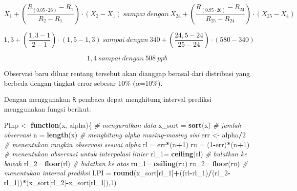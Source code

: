 \documentclass[]{book}
\newenvironment{Shaded}{\begin{snugshade}}{\end{snugshade}}
\newcommand{\KeywordTok}[1]{\textcolor[rgb]{0.13,0.29,0.53}{\textbf{#1}}}
\newcommand{\DecValTok}[1]{\textcolor[rgb]{0.00,0.00,0.81}{#1}}
\newcommand{\StringTok}[1]{\textcolor[rgb]{0.31,0.60,0.02}{#1}}
\newcommand{\CommentTok}[1]{\textcolor[rgb]{0.56,0.35,0.01}{\textit{#1}}}
\newcommand{\ControlFlowTok}[1]{\textcolor[rgb]{0.13,0.29,0.53}{\textbf{#1}}}
\newcommand{\OperatorTok}[1]{\textcolor[rgb]{0.81,0.36,0.00}{\textbf{#1}}}
\newcommand{\NormalTok}[1]{#1}
\begin{document}
\[
  X_1+\left(\frac{R_{\left(0.05\cdot26\right)}-R_1}{R_2-R_1}\right)\cdot\left(X_2-X_1\right)\ sampai\ dengan\ X_{24}+\left(\frac{R_{\left(0.95\cdot26\right)}-R_{24}}{R_{25}-R_{24}}\right)\cdot\left(X_{25}-X_4\right)
\]

\[
  1,3+\left(\frac{1,3-1}{2-1}\right)\cdot\left(1,5-1,3\right)\ sampai\ dengan\ 340+\left(\frac{24,5-24}{25-24}\right)\cdot\left(580-340\right)
\]

\[
  1,4\ sampai\ dengan\ 508\ ppb
\]

Observasi baru diluar rentang tersebut akan dianggap berasal dari
distribusi yang berbeda dengan tingkat error sebesar 10\%
(\(\alpha\)=10\%).

Dengan menggunakan \texttt{R} pembaca depat menghitung interval prediksi
menggunakan fungsi berikut:

\begin{Shaded}
\begin{Highlighting}[]
\NormalTok{PInp <-}\StringTok{ }\ControlFlowTok{function}\NormalTok{(x, alpha)\{}
  \CommentTok{# mengurutkan data}
\NormalTok{  x_sort =}\StringTok{ }\KeywordTok{sort}\NormalTok{(x)}
  \CommentTok{# jumlah observasi}
\NormalTok{  n =}\StringTok{ }\KeywordTok{length}\NormalTok{(x)}
  \CommentTok{# menghitung alpha masing-masing sisi}
\NormalTok{  err <-}\StringTok{ }\NormalTok{alpha}\OperatorTok{/}\DecValTok{2}
  \CommentTok{# menentukan rangkin observasi sesuai alpha}
\NormalTok{  rl =}\StringTok{ }\NormalTok{err}\OperatorTok{*}\NormalTok{(n}\OperatorTok{+}\DecValTok{1}\NormalTok{)}
\NormalTok{  ru =}\StringTok{ }\NormalTok{(}\DecValTok{1}\OperatorTok{-}\NormalTok{err)}\OperatorTok{*}\NormalTok{(n}\OperatorTok{+}\DecValTok{1}\NormalTok{)}
  \CommentTok{# menentukan observasi untuk interpolasi linier}
\NormalTok{  rl_}\DecValTok{1}\NormalTok{=}\StringTok{ }\KeywordTok{ceiling}\NormalTok{(rl) }\CommentTok{# bulatkan ke bawah}
\NormalTok{  rl_}\DecValTok{2}\NormalTok{=}\StringTok{ }\KeywordTok{floor}\NormalTok{(rl) }\CommentTok{# bulatkan ke atas}
\NormalTok{  ru_}\DecValTok{1}\NormalTok{=}\StringTok{ }\KeywordTok{ceiling}\NormalTok{(ru) }
\NormalTok{  ru_}\DecValTok{2}\NormalTok{=}\StringTok{ }\KeywordTok{floor}\NormalTok{(ru)}
  \CommentTok{# menentukan interval prediksi}
\NormalTok{  LPI =}\StringTok{ }\KeywordTok{round}\NormalTok{(x_sort[rl_}\DecValTok{1}\NormalTok{]}\OperatorTok{+}\NormalTok{((rl}\OperatorTok{-}\NormalTok{rl_}\DecValTok{1}\NormalTok{)}\OperatorTok{/}\NormalTok{(rl_}\DecValTok{2}\OperatorTok{-}\NormalTok{rl_}\DecValTok{1}\NormalTok{))}\OperatorTok{*}\NormalTok{(x_sort[rl_}\DecValTok{2}\NormalTok{]}\OperatorTok{-}\NormalTok{x_sort[rl_}\DecValTok{1}\NormalTok{]),}\DecValTok{1}\NormalTok{)}

\end{Highlighting}
\end{Shaded}
\end{document}
